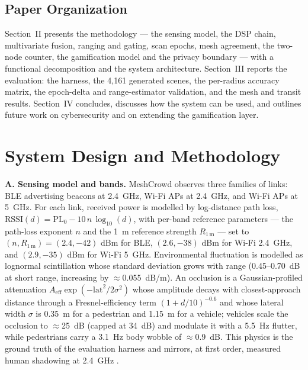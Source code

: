 \documentclass[journal,10pt]{IEEEtran}
\begin{document}
\subsection{Paper Organization}
Section~II presents the methodology --- the sensing model, the DSP chain,
multivariate fusion, ranging and gating, scan epochs, mesh agreement, the
two-node counter, the gamification model and the privacy boundary --- with a
functional decomposition and the system architecture. Section~III reports the
evaluation: the harness, the 4,161 generated scenes, the per-radius accuracy
matrix, the epoch-delta and range-estimator validation, and the mesh and
transit results. Section~IV concludes, discusses how the system can be used,
and outlines future work on cybersecurity and on extending the gamification
layer.

\section{System Design and Methodology}

\textbf{A. Sensing model and bands.} MeshCrowd observes three families of
links: BLE advertising beacons at 2.4~GHz, Wi-Fi APs at 2.4~GHz, and Wi-Fi APs
at 5~GHz. For each link, received power is modelled by log-distance path loss,
$\mathrm{RSSI}(d) = \mathrm{PL}_0 - 10\,n\,\log_{10}(d)$, with per-band
reference parameters --- the path-loss exponent $n$ and the 1~m reference
strength $R_{1\,\mathrm{m}}$ --- set to $(n, R_{1\,\mathrm{m}}) = (2.4, -42)$
dBm for BLE, $(2.6, -38)$ dBm for Wi-Fi 2.4~GHz, and $(2.9, -35)$ dBm for Wi-Fi
5~GHz. Environmental fluctuation is modelled as lognormal scintillation whose
standard deviation grows with range (0.45--0.70~dB at short range, increasing by
$\approx$0.055~dB/m). An occlusion is a Gaussian-profiled attenuation
$A_{\mathrm{eff}}\exp(-\mathrm{lat}^2/2\sigma^2)$ whose amplitude decays with
closest-approach distance through a Fresnel-efficiency term $(1+d/10)^{-0.6}$
and whose lateral width $\sigma$ is 0.35~m for a pedestrian and 1.15~m for a
vehicle; vehicles scale the occlusion to $\approx$25~dB (capped at 34~dB) and
modulate it with a 5.5~Hz flutter, while pedestrians carry a 3.1~Hz body wobble
of $\approx$0.9~dB. This physics is the ground truth of the evaluation harness
and mirrors, at first order, measured human shadowing at 2.4~GHz
\cite{januszkiewicz2018}.
\end{document}
